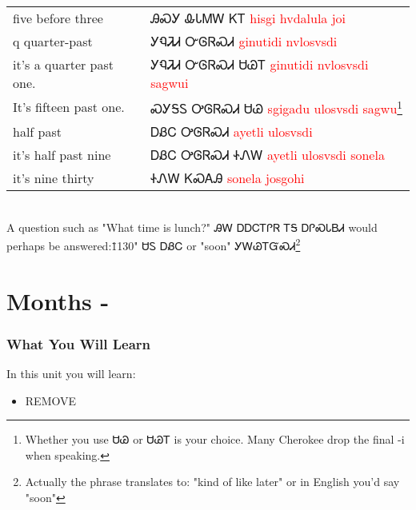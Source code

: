 \cite{feelingHiderGregg202Dpp9}\\
\begin{minipage}{\linewidth}
\begin{tabular}{p{3cm} p{11cm}}
five before three & ᎯᏍᎩ ᎲᏓᎷᎳ ᏦᎢ 
 \newline \textcolor{red}{hisgi hvdalula joi}\\
q quarter-past & ᎩᏄᏘᏗ ᏅᎶᏒᏍᏗ 
 \newline \textcolor{red}{ginutidi nvlosvsdi}\\
it's a quarter past one. & ᎩᏄᏘᏗ ᏅᎶᏒᏍᏗ ᏌᏊᎢ 
 \newline \textcolor{red}{ginutidi nvlosvsdi sagwui}\\
It's fifteen past one. & ᏍᎩᎦᏚ ᎤᎶᏒᏍᏗ ᏌᏊ 
 \newline \textcolor{red}{sgigadu ulosvsdi sagwu}\footnote{Whether you use ᏌᏊ or ᏌᏊᎢ is your choice.  Many Cherokee drop the final -i when speaking.}\\
half past & ᎠᏰᏟ ᎤᎶᏒᏍᏗ 
 \newline \textcolor{red}{ayetli ulosvsdi}\\
it's half past nine & ᎠᏰᏟ ᎤᎶᏒᏍᏗ ᏐᏁᎳ 
 \newline \textcolor{red}{ayetli ulosvsdi sonela}\\
it's nine thirty & ᏐᏁᎳ ᏦᏍᎪᎯ 
 \newline \textcolor{red}{sonela josgohi}\\
\end{tabular}
\end{minipage}

\cite{feelingHiderGregg202Dpp9}\\
A question such as "What time is lunch?" ᎯᎳ ᎠᎠᏟᎢᎵᏒ ᎢᎦ ᎠᎵᏍᏓᏴᏗ would perhaps be answered:\"1130" ᏌᏚ ᎠᏰᏟ or "soon" ᎩᎳᏊᎢᏳᏍᏗ\footnote{Actually the phrase translates to: "kind of like later" or in English you'd say "soon"}\cite{feelingHiderGregg202Dpp9}
\index{}
\chapter{Months - }
\subsection{What You Will Learn}
In this unit you will learn:
\begin{itemize}
\item REMOVE
\end{itemize}\newpage

